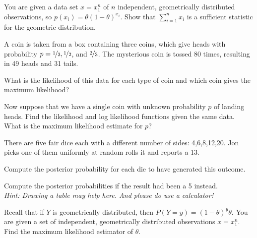 \documentclass[10pt, a5paper]{scrartcl}
\begin{document}
\boardquestions

\begin{exercise}
  You are given a data set $ x=x_{1}^{n} $ of $ n $ independent, geometrically
  distributed observations, so $p(x_i) = \theta(1-\theta)^{x_i} $. Show that $ \sum_{i=1}^{n} x_i $ is a sufficient
  statistic for the geometric distribution.
\end{exercise}


\begin{exercise}[Covariance]
  A coin is taken from a box containing three coins, which give heads with
  probability $p = \nicefrac{1}{3}, \nicefrac{1}{2}$, and $\nicefrac{2}{3}$.
  The mysterious coin is tossed 80 times, resulting in 49 heads and 31 tails.

  \begin{subex}
    What is the likelihood of this data for each type of coin and which coin
    gives the maximum likelihood?
  \end{subex}
  
  \begin{subex}
    Now suppose that we have a single coin with unknown probability $p$ of
    landing heads. Find the likelihood and log likelihood functions given the
    same data. What is the maximum likelihood estimate for $p$?
  \end{subex}
\end{exercise}


\begin{exercise}[Dice]
  There are five fair dice each with a different number of sides: 4,6,8,12,20.
  Jon picks one of them uniformly at random rolls it and reports a 13.
  
  \begin{subex}	
    Compute the posterior probability for each die to have generated this
    outcome.
  \end{subex}
  
  \begin{subex}	
    Compute the posterior probabilities if the result had been a 5 instead. \\
    \emph{Hint: Drawing a table may help here. And please do use a calculator!}
  \end{subex}
\end{exercise}


\begin{exercise}
  Recall that if $Y$ is  geometrically distributed, then 
  $P(Y=y) = (1-\theta)^{y}\theta$.
  You are given a set of independent, geometrically distributed observations 
  $x = x_{1}^{n}$. Find the maximum likelihood estimator of $\theta$.
\end{exercise}

\vfill\creditsboardquestions
\end{document}
